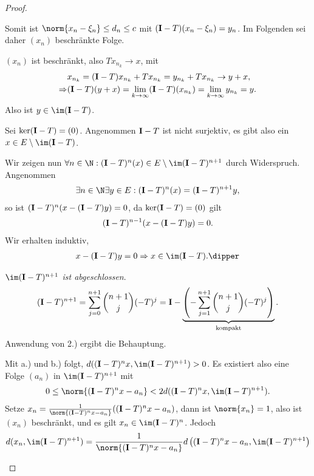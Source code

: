 \begin{proof}
\begin{proofenum}
\begin{proofenuma}
Somit ist $\norm{x_n-\xi_n}\le d_n \le c$ mit $(\mathbf{I}-T)(x_n-\xi_n)=y_n$. Im
Folgenden sei daher $(x_n)$ beschränkte Folge.
\item $(x_n)$ ist beschränkt, also $Tx_{n_k}\to x$, mit
\begin{align*}
&x_{n_k} = (\mathbf{I}-T)x_{n_k} + Tx_{n_k} = y_{n_k} + Tx_{n_k} \to y + x,\\
\Rightarrow &
(\mathbf{I}-T)(y+x) = \lim\limits_{k\to\infty} (\mathbf{I}-T)(x_{n_k}) =
\lim\limits_{k\to\infty} y_{n_k} = y.
\end{align*}
Also ist $y\in \im (\Id-T)$.
\end{proofenuma}
\item Sei $\ker(\mathbf{I}-T)=(0)$. Angenommen $\mathbf{I}-T$ ist nicht surjektiv, es gibt
also ein $x\in E\setminus\im (\Id-T)$.
\begin{proofenuma}
\item Wir zeigen nun $\forall n\in \N: (\Id-T)^n(x) \in E\setminus
\im (\Id-T)^{n+1}$ durch Widerspruch. Angenommen
\begin{align*}
\exists n\in\N \exists y\in E : (\Id-T)^n(x) = (\Id-T)^{n+1}y,
\end{align*}
so ist $(\mathbf{I}-T)^n(x-(\mathbf{I}-T)y) = 0$, da $\ker (\mathbf{I}-T) = (0)$ gilt
\begin{align*}
(\mathbf{I}-T)^{n-1}(x-(\mathbf{I}-T)y) = 0.
\end{align*}
Wir erhalten induktiv,
\begin{align*}
x-(\Id-T)y = 0 \Rightarrow x\in\im (\Id-T).\dipper
\end{align*}
\item \textit{$\im (\Id-T)^{n+1}$ ist abgeschlossen}.
\begin{align*}
(\mathbf{I}-T)^{n+1} = \sum\limits_{j=0}^{n+1}\binom{n+1}{j} (-T)^j
= \mathbf{I} - \underbrace{\left(-\sum\limits_{j=1}^{n+1}\binom{n+1}{j}
(-T)^j\right)}_{\text{kompakt}}.
\end{align*}
Anwendung von 2.) ergibt die Behauptung.
\item Mit a.) und b.) folgt, $d((\Id-T)^nx,\im(\Id-T)^{n+1})>0$. Es existiert
also eine Folge $(a_n)$ in $\im (\Id-T)^{n+1}$ mit
\begin{align*}
0 \le \norm{(\Id-T)^{n}x-a_n} < 2d((\Id-T)^nx, \im (\Id-T)^{n+1}).
\end{align*}
Setze $x_n = \frac{1}{\norm{(\Id-T)^nx-a_n}}((\Id-T)^nx-a_n)$, dann ist
$\norm{x_n}=1$, also ist $(x_n)$ beschränkt, und es gilt $x_n\in \im
(\Id-T)^n$. Jedoch
\begin{align*}
d(x_n,\im(\Id-T)^{n+1}) &= \frac{1}{\norm{(\Id-T)^nx-a_n}}d
\left((\Id-T)^nx -a_n,\im (\Id-T)^{n+1}\right)\\

\end{align*}
\end{proofenuma}
\end{proofenum}
\end{proof}
